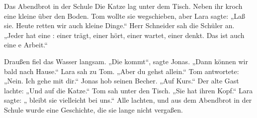 \documentclass[12pt]{nextbook}
\begin{document}
\begin{readersection}{Das Abendbrot in der Schule}
Die Katze lag unter dem Tisch. Neben ihr kroch eine kleine  über den Boden. Tom wollte sie wegschieben, aber Lara sagte: „Laß sie. Heute retten wir auch kleine Dinge.“ Herr Schneider sah die Schüler an. „Jeder hat eine : einer trägt, einer hört, einer wartet, einer denkt. Das ist auch eine e Arbeit.“

Draußen fiel das Wasser langsam. „Die  kommt“, sagte Jonas. „Dann können wir bald nach Hause.“ Lara sah zu Tom. „Aber du gehst  allein.“ Tom antwortete: „Nein. Ich gehe mit dir.“ Jonas hob seinen Becher. „Auf  Kurs.“ Der alte Gast lachte: „Und auf die Katze.“ Tom sah unter den Tisch. „Sie hat ihren  Kopf.“ Lara sagte: „ bleibt sie vielleicht bei uns.“ Alle lachten, und aus dem Abendbrot in der Schule wurde eine Geschichte, die sie lange nicht vergaßen.

\end{readersection}
\end{document}
